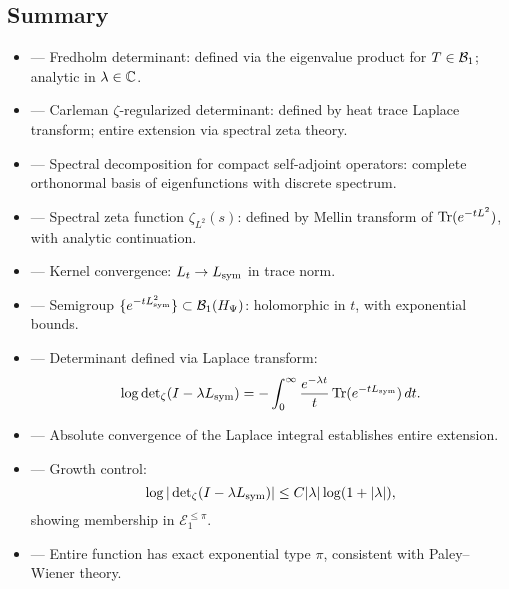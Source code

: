 \subsection*{Summary}

\begin{itemize}
  \item {} — Fredholm determinant: defined via the eigenvalue product for \( T \in \mathcal{B}_1 \); analytic in \( \lambda \in \mathbb{C} \).
  \item {} — Carleman \(\zeta\)-regularized determinant: defined by heat trace Laplace transform; entire extension via spectral zeta theory.
  \item {} — Spectral decomposition for compact self-adjoint operators: complete orthonormal basis of eigenfunctions with discrete spectrum.
  \item {} — Spectral zeta function \( \zeta_{L^2}(s) \): defined by Mellin transform of \( \operatorname{Tr}(e^{-t L^2}) \), with analytic continuation.

  \item {} — Kernel convergence: \( L_t \to L_{\mathrm{sym}} \) in trace norm.
  \item {} — Semigroup \( \{e^{-tL_{\mathrm{sym}}^2}\} \subset \mathcal{B}_1(H_{\Psi}) \): holomorphic in \( t \), with exponential bounds.
  \item {} — Determinant defined via Laplace transform:
  \[
  \log \det\nolimits_{\zeta}(I - \lambda L_{\mathrm{sym}}) = - \int_0^\infty \frac{e^{-\lambda t}}{t} \operatorname{Tr}(e^{-t L_{\mathrm{sym}}}) \, dt.
  \]
  \item {} — Absolute convergence of the Laplace integral establishes entire extension.
  \item {} — Growth control:
  \[
  \log |\det\nolimits_{\zeta}(I - \lambda L_{\mathrm{sym}})| \le C |\lambda| \log(1 + |\lambda|),
  \]
  showing membership in \( \mathcal{E}_1^{\leq \pi} \).
  \item {} — Entire function has exact exponential type \( \pi \), consistent with Paley--Wiener theory.


\end{itemize}
